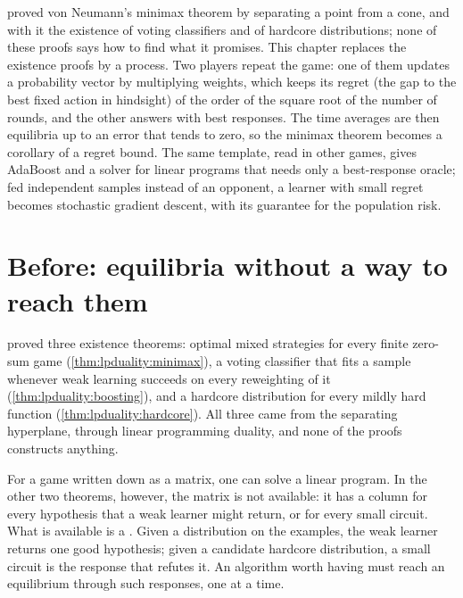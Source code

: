\begin{refsection}

\newcommand{\rgone}{\mathbf{1}}
\newcommand{\rgerr}{\operatorname{err}}

\begin{chaptersummary}
 proved von Neumann's minimax theorem by separating a point from a cone, and with it the existence of voting classifiers and of hardcore distributions; none of these proofs says how to find what it promises. This chapter replaces the existence proofs by a process. Two players repeat the game: one of them updates a probability vector by multiplying weights, which keeps its regret (the gap to the best fixed action in hindsight) of the order of the square root of the number of rounds, and the other answers with best responses. The time averages are then equilibria up to an error that tends to zero, so the minimax theorem becomes a corollary of a regret bound. The same template, read in other games, gives AdaBoost and a solver for linear programs that needs only a best-response oracle; fed independent samples instead of an opponent, a learner with small regret becomes stochastic gradient descent, with its guarantee for the population risk.
\end{chaptersummary}

\section{Before: equilibria without a way to reach them}\label{sec:regret:before}

 proved three existence theorems: optimal mixed strategies for every finite zero-sum game (\cref{thm:lpduality:minimax}), a voting classifier that fits a sample whenever weak learning succeeds on every reweighting of it (\cref{thm:lpduality:boosting}), and a hardcore distribution for every mildly hard function (\cref{thm:lpduality:hardcore}). All three came from the separating hyperplane, through linear programming duality, and none of the proofs constructs anything.

For a game written down as a matrix, one can solve a linear program. In the other two theorems, however, the matrix is not available: it has a column for every hypothesis that a weak learner might return, or for every small circuit. What is available is a . Given a distribution on the examples, the weak learner returns one good hypothesis; given a candidate hardcore distribution, a small circuit is the response that refutes it. An algorithm worth having must reach an equilibrium through such responses, one at a time.


\end{refsection}
